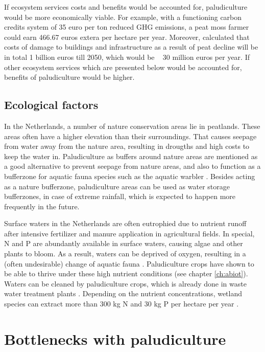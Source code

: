 {%
If ecosystem services costs and benefits would be accounted for, paludiculture would be more economically viable. For example, with a functioning carbon credits system of 35 euro per ton reduced GHG emissions, a peat moss farmer could earn 466.67 euros extera per hectare per year. Moreover, \citet{van2016dalende} calculated that costs of damage to buildings and infrastructure as a result of peat decline will be in total 1 billion euros till 2050, which would be ~ 30 million euros per year. If other ecosystem services which are presented below would be accounted for, benefits of paludiculture would be higher.

\subsection{Ecological factors}
In the Netherlands, a number of nature conservation areas lie in peatlands. These areas often have a higher elevation than their surroundings. That causes seepage from water away from the nature area, resulting in drougths and high costs to keep the water in. Paludiculture as buffers around nature areas are mentioned as a good alternative to prevent seepage from nature areas, and also to function as a bufferzone for aquatic fauna species such as the aquatic warbler \citep{van2013rewetting}. Besides acting as a nature bufferzone, paludiculture areas can be used as water storage bufferzones, in case of extreme rainfall, which is expected to happen more frequently in the future. 

Surface waters in the Netherlands are often eutrophied due to nutrient runoff after intensive fertilizer and manure application in agricultural fields. In special, N and P are abundantly available in surface waters, causing algae and other plants to bloom. As a result, waters can be deprived of oxygen, resulting in a (often undesirable) change of aquatic fauna \citep{waajen2014eutrophic}. Paludiculture crops have shown to be able to thrive under these high nutrient conditions (see chapter \ref{ch:abiot}). Waters can be cleaned by paludiculture crops, which is already done in waste water treatment plants \citep{}. Depending on the nutrient concentrations, wetland species can extract more than 300 kg N and 30 kg P per hectare per year \citep{Land2016}. 



\section{Bottlenecks with paludiculture}

}
